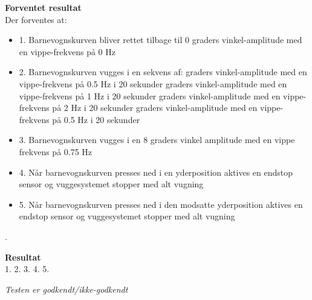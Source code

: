 \textbf{Forventet resultat} \\
Der forventes at:
\begin{itemize}
	\item 1. Barnevognskurven bliver rettet tilbage til 0 graders vinkel-amplitude med en vippe-frekvens på 0 Hz
	\item 2. Barnevognskurven vugges i en sekvens af:
		 graders vinkel-amplitude med en vippe-frekvens på 0.5 Hz i 20 sekunder 
		 graders vinkel-amplitude med en vippe-frekvens på 1 Hz  i 20 sekunder  
		 graders vinkel-amplitude med en vippe-frekvens på 2 Hz i 20 sekunder 
		 graders vinkel-amplitude med en vippe-frekvens på 0.5 Hz i 20 sekunder
	\item 3. Barnevognskurven vugges i en 8 graders vinkel amplitude med en vippe frekvens på 0.75 Hz
	\item 4. Når barnevognskurven presses ned i en yderposition aktives en endstop sensor og vuggesystemet stopper med alt vugning 
	\item 5. Når barnevognskurven presses ned i den modsatte yderposition aktives en endstop sensor og vuggesystemet stopper med alt vugning 
\end{itemize}
.

\textbf{Resultat} \\
1.
2.
3.
4.
5.



\textit{Testen er godkendt/ikke-godkendt}